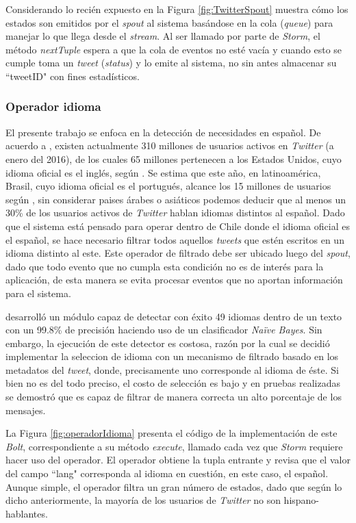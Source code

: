 Considerando lo recién expuesto en la Figura \ref{fig:TwitterSpout} muestra cómo los estados son emitidos por el \textit{spout} al sistema basándose en la cola (\textit{queue}) para manejar lo que llega desde el \textit{stream}. Al ser llamado por parte de \textit{Storm}, el método \textit{nextTuple} espera a que la cola de eventos no esté vacía y cuando esto se cumple toma un \textit{tweet} (\textit{status}) y lo emite al sistema, no sin antes almacenar su ``tweetID" con fines estadísticos.

\subsubsection*{Operador idioma}
\label{subsubsec:1op}

El presente trabajo se enfoca en la detección de necesidades en español. De acuerdo a \citep{TwitterActiveUsers}, existen actualmente 310 millones de usuarios activos en \textit{Twitter} (a enero del 2016), de los cuales 65 millones pertenecen a los Estados Unidos, cuyo idioma oficial es el inglés, según \citep{TwitterStats1}. Se estima que este año, en latinoamérica, Brasil, cuyo idioma oficial es el portugués, alcance los 15 millones de usuarios según \citep{TwitterStats2}, sin considerar paises árabes o asiáticos podemos deducir que al menos un 30\% de los usuarios activos de \textit{Twitter} hablan idiomas distintos al español. Dado que el sistema está pensado para operar dentro de Chile donde el idioma oficial es el español, se hace necesario filtrar todos aquellos \textit{tweets} que estén escritos en un idioma distinto al este. Este operador de filtrado debe ser ubicado luego del \textit{spout}, dado que todo evento que no cumpla esta condición no es de interés para la aplicación, de esta manera se evita procesar eventos que no aportan información para el sistema.

\citep{languageDetector} desarrolló un módulo capaz de detectar con éxito 49 idiomas dentro de un texto con un 99.8\% de precisión haciendo uso de un clasificador \textit{Naïve Bayes}. Sin embargo, la ejecución de este detector es costosa, razón por la cual se decidió implementar la seleccion de idioma con un mecanismo de filtrado basado en los metadatos del \textit{tweet}, donde, precisamente uno corresponde al idioma de éste. Si bien no es del todo preciso, el costo de selección es bajo y en pruebas realizadas se demostró que es capaz de filtrar de manera correcta un alto porcentaje de los mensajes.

La Figura \ref{fig:operadorIdioma} presenta el código de la implementación de este \textit{Bolt}, correspondiente a su método \textit{execute}, llamado cada vez que \textit{Storm} requiere hacer uso del operador. El operador obtiene la tupla entrante y revisa que el valor del campo ``lang" corresponda al idioma en cuestión, en este caso, el español. Aunque simple, el operador filtra un gran número de estados, dado que según lo dicho anteriormente, la mayoría de los usuarios de \textit{Twitter} no son hispano-hablantes. 

